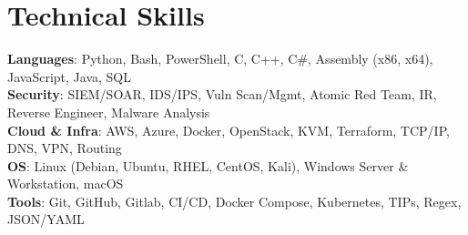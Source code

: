 \documentclass[letterpaper,11pt]{article}
\begin{document}
\section{Technical Skills}
 \begin{itemize}[leftmargin=0.15in, label={}]
    \small{\item{
        \textbf{Languages}{: Python, Bash, PowerShell, C, C++, C\#, Assembly (x86, x64), JavaScript, Java, SQL} \\
        \textbf{Security}{: SIEM/SOAR, IDS/IPS, Vuln Scan/Mgmt, Atomic Red Team, IR, Reverse Engineer, Malware Analysis} \\
        \textbf{Cloud \& Infra}{: AWS, Azure, Docker, OpenStack, KVM, Terraform, TCP/IP, DNS, VPN, Routing} \\
        \textbf{OS}{: Linux (Debian, Ubuntu, RHEL, CentOS, Kali), Windows Server \& Workstation, macOS} \\
        \textbf{Tools}{: Git, GitHub, Gitlab, CI/CD, Docker Compose, Kubernetes, TIPs, Regex, JSON/YAML}
    }}
 \end{itemize}


\end{document}
